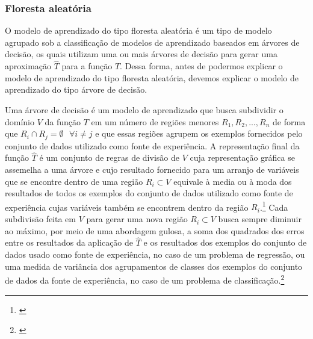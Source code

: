 \subsubsection{Floresta aleatória}

O modelo de aprendizado do tipo floresta aleatória é um tipo de modelo agrupado sob a classificação de modelos de aprendizado baseados em árvores de decisão, os quais utilizam uma ou mais árvores de decisão para gerar uma aproximação $\hat{T}$ para a função $T$. Dessa forma, antes de podermos explicar o modelo de aprendizado do tipo floresta aleatória, devemos explicar o modelo de aprendizado do tipo árvore de decisão.

Uma árvore de decisão é um modelo de aprendizado que busca subdividir o domínio $V$ da função $T$ em um número de regiões menores $R_{1}, R_{2}, ..., R_{n}$ de forma que $R_{i} \cap R_{j} = \emptyset \text{ } \forall i \ne j$ e que essas regiões agrupem os exemplos fornecidos pelo conjunto de dados utilizado como fonte de experiência. A representação final da função $\hat{T}$ é um conjunto de regras de divisão de $V$ cuja representação gráfica se assemelha a uma árvore e cujo resultado fornecido para um arranjo de variáveis que se encontre dentro de uma região $R_{i} \subset V$ equivale à media ou à moda dos resultados de todos os exemplos do conjunto de dados utilizado como fonte de experiência cujas variáveis também se encontrem dentro da região $R_{i}$.\footnote{\cite[p.303]{statistical_learning}} Cada subdivisão feita em $V$ para gerar uma nova região $R_{i} \subset V$ busca sempre diminuir ao máximo, por meio de uma abordagem gulosa, a soma dos quadrados dos erros entre os resultados da aplicação de $\hat{T}$ e os resultados dos exemplos do conjunto de dados usado como fonte de experiência, no caso de um problema de regressão, ou uma medida de variância dos agrupamentos de classes dos exemplos do conjunto de dados da fonte de experiência, no caso de um problema de classificação.\footnote{\cite[p.306-307, 312]{statistical_learning}}

